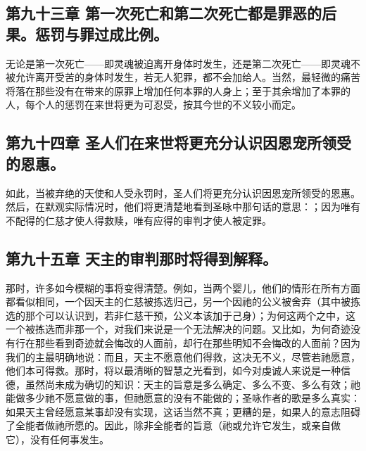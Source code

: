 \subsection{第九十三章 第一次死亡和第二次死亡都是罪恶的后果。惩罚与罪过成比例。}

无论是第一次死亡——即灵魂被迫离开身体时发生，还是第二次死亡——即灵魂不被允许离开受苦的身体时发生，若无人犯罪，都不会加给人。当然，最轻微的痛苦将落在那些没有在带来的原罪上增加任何本罪的人身上；至于其余增加了本罪的人，每个人的惩罚在来世将更为可忍受，按其今世的不义较小而定。\par


\subsection{第九十四章 圣人们在来世将更充分认识因恩宠所领受的恩惠。}

如此，当被弃绝的天使和人受永罚时，圣人们将更充分认识因恩宠所领受的恩惠。然后，在默观实际情况时，他们将更清楚地看到圣咏中那句话的意思：；因为唯有不配得的仁慈才使人得救赎，唯有应得的审判才使人被定罪。\par


\subsection{第九十五章 天主的审判那时将得到解释。}

那时，许多如今模糊的事将变得清楚。例如，当两个婴儿，他们的情形在所有方面都看似相同，一个因天主的仁慈被拣选归己，另一个因祂的公义被舍弃（其中被拣选的那个可以认识到，若非仁慈干预，公义本该加于己身）；为何这两个之中，这一个被拣选而非那一个，对我们来说是一个无法解决的问题。又比如，为何奇迹没有行在那些看到奇迹就会悔改的人面前，却行在那些明知不会悔改的人面前？因为我们的主最明确地说：而且，天主不愿意他们得救，这决无不义，尽管若祂愿意，他们本可得救。那时，将以最清晰的智慧之光看到，如今对虔诚人来说是一种信德，虽然尚未成为确切的知识：天主的旨意是多么确定、多么不变、多么有效；祂能做多少祂不愿意做的事，但祂愿意的没有不能做的；圣咏作者的歌是多么真实：如果天主曾经愿意某事却没有实现，这话当然不真；更糟的是，如果人的意志阻碍了全能者做祂所愿的。因此，除非全能者的旨意（祂或允许它发生，或亲自做它），没有任何事发生。\par

